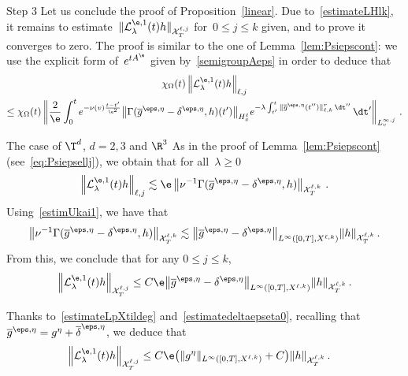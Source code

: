 \begin{step}{Step 3}
Let us conclude the proof of Proposition~\ref{linear}. Due to~\eqref{estimateLHlk}, it remains to estimate~$\|\mathcal{L}_\lambda^{\e,1}(t)h\|_{\mathcal{X}_T^{\ell,j} }$ for~$0 \le j \le k$ given, and to prove it converges to zero. The proof is similar to the one of Lemma~\ref{lem:Psiepscont}: we use the explicit form of~$e^{tA^\e}$ given by~\eqref{semigroupAeps} in order to deduce that
\begin{multline*}
\chi_\Omega(t)\left\| \mathcal{L}_\lambda^{\e,1}(t)h \right\|_{{\ell,j}} \\
\le \chi_\Omega(t)\left\| \frac{2}{\e} \int_0^t e^{-\nu(v)\frac{t-t'}{\e^2}} \big\|\Gamma(\overline g^{\eps,\eta}-\delta^{\eps,\eta},h)(t')\big\|_{H^\ell_x} e^{-\lambda \int_{t'}^t \|\overline g^{\eps,\eta}(t'')\|^r_{\ell,k} \, \dt''} \, \dt' \right\|_{L^{\infty,j}_v}\,.
\end{multline*}

\begin{step}{The case of $\T^d$, $d = 2,3$ and $\R^3$}
As in the proof of Lemma~\ref{lem:Psiepscont} (see~\eqref{eq:Psiepsellj}), we obtain that for all~$\lambda \geq 0$
\[
\left\|\mathcal{L}_\lambda^{\e,1}(t)h\right\|_{{\ell,j}}
\lesssim \e \left\| \nu^{-1} \Gamma (\overline g^{\eps,\eta}-\delta^{\eps,\eta},h) \right\|_{\mathcal{X}_T^{\ell,k} }\,.
\]
Using~\eqref{estimUkai1}, we have that
\begin{equation}\label{eq:Lambda-1Gamma}
\left\| \nu^{-1} \Gamma (\overline g^{\eps,\eta}-\delta^{\eps,\eta},h) \right\|_{\mathcal{X}^{\ell,k}_T} \lesssim \big\|\overline g^{\eps,\eta}-\delta^{\eps,\eta}\big\|_{L^\infty([0,T], X^{\ell,k})} \|h\|_{\mathcal{X}^{\ell,k}_T}\,.
\end{equation}
From this, we conclude that for any $0 \le j \le k$,
\[
\left\|\mathcal{L}_\lambda^{\e,1}(t)h\right\|_{\mathcal{X}_T^{\ell,j} } \le C\e \big\|\overline g^{\eps,\eta}-\delta^{\eps,\eta}\big\|_{L^\infty([0,T], X^{\ell,k})} \|h\|_{\mathcal{X}_T^{\ell,k} }\,.
\]
\end{step}

Thanks to~\eqref{estimateLpXtildeg} and~\eqref{estimatedeltaepseta0}, recalling that~$\overline g^{\eps,\eta} = g^{\eta}+\overline \delta^{\eps,\eta}$, we deduce that
\begin{align*}
\left\|\mathcal{L}_\lambda^{\e,1}(t)h\right\|_{\mathcal{X}_T^{\ell,j} } &\le C\e \big(\|{g^\eta } \|_{L^\infty([0,T], X^{\ell,k})} +C\big) \|h\|_{\mathcal{X}_T^{\ell,k} }\,.
\end{align*}


\end{step}
